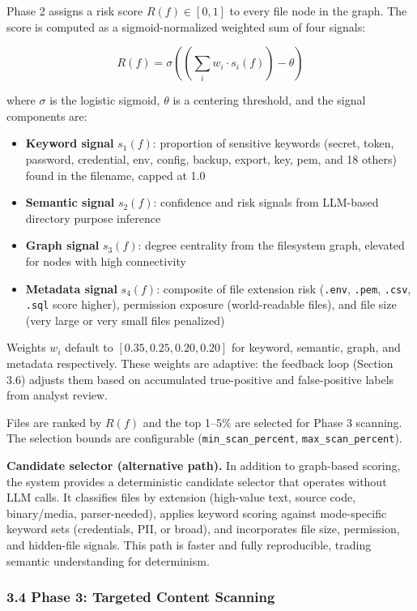 \documentclass[
]{article}
\providecommand{\tightlist}{%
  \setlength{\itemsep}{0pt}\setlength{\parskip}{0pt}}
\begin{document}
Phase 2 assigns a risk score \(R(f) \in [0, 1]\) to every file node in
the graph. The score is computed as a sigmoid-normalized weighted sum of
four signals:

\[R(f) = \sigma\left(\left(\sum_{i} w_i \cdot s_i(f)\right) - \theta\right)\]

where \(\sigma\) is the logistic sigmoid, \(\theta\) is a centering
threshold, and the signal components are:

\begin{itemize}
\tightlist
\item
  \textbf{Keyword signal} \(s_1(f)\): proportion of sensitive keywords
  (secret, token, password, credential, env, config, backup, export,
  key, pem, and 18 others) found in the filename, capped at 1.0
\item
  \textbf{Semantic signal} \(s_2(f)\): confidence and risk signals from
  LLM-based directory purpose inference
\item
  \textbf{Graph signal} \(s_3(f)\): degree centrality from the
  filesystem graph, elevated for nodes with high connectivity
\item
  \textbf{Metadata signal} \(s_4(f)\): composite of file extension risk
  (\texttt{.env}, \texttt{.pem}, \texttt{.csv}, \texttt{.sql} score
  higher), permission exposure (world-readable files), and file size
  (very large or very small files penalized)
\end{itemize}

Weights \(w_i\) default to \([0.35, 0.25, 0.20, 0.20]\) for keyword,
semantic, graph, and metadata respectively. These weights are adaptive:
the feedback loop (Section 3.6) adjusts them based on accumulated
true-positive and false-positive labels from analyst review.

Files are ranked by \(R(f)\) and the top 1--5\% are selected for Phase 3
scanning. The selection bounds are configurable
(\texttt{min\_scan\_percent}, \texttt{max\_scan\_percent}).

\textbf{Candidate selector (alternative path).} In addition to
graph-based scoring, the system provides a deterministic candidate
selector that operates without LLM calls. It classifies files by
extension (high-value text, source code, binary/media, parser-needed),
applies keyword scoring against mode-specific keyword sets (credentials,
PII, or broad), and incorporates file size, permission, and hidden-file
signals. This path is faster and fully reproducible, trading semantic
understanding for determinism.

\subsubsection{3.4 Phase 3: Targeted Content
Scanning}\label{phase-3-targeted-content-scanning}
\end{document}
